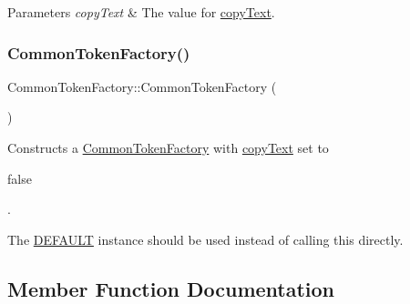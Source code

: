 \begin{DoxyParams}{Parameters}
{\em copy\+Text} & The value for \hyperlink{classantlr4_1_1CommonTokenFactory_a944c106da2cf4638ea989bcb20b482df}{copy\+Text}. \\
\hline
\end{DoxyParams}
\mbox{\label{classantlr4_1_1CommonTokenFactory_a4bf0a30d96f0239d56c72d0b5dc634f7}} 
\subsubsection{\texorpdfstring{Common\+Token\+Factory()}{CommonTokenFactory()}\hspace{0.1cm}{\footnotesize\ttfamily [2/2]}}
{\footnotesize\ttfamily Common\+Token\+Factory\+::\+Common\+Token\+Factory (\begin{DoxyParamCaption}{ }\end{DoxyParamCaption})}

Constructs a \hyperlink{classantlr4_1_1CommonTokenFactory}{Common\+Token\+Factory} with \hyperlink{classantlr4_1_1CommonTokenFactory_a944c106da2cf4638ea989bcb20b482df}{copy\+Text} set to 
\begin{DoxyCode}
\textcolor{keyword}{false} 
\end{DoxyCode}
 .

The \hyperlink{classantlr4_1_1CommonTokenFactory_a141e9716e14a7b5c43a6d0bd3db82bcd}{D\+E\+F\+A\+U\+LT} instance should be used instead of calling this directly.

\subsection{Member Function Documentation}
\mbox{\label{classantlr4_1_1CommonTokenFactory_ae5b0ee244ce69cf24a71c81167328be1}} 
